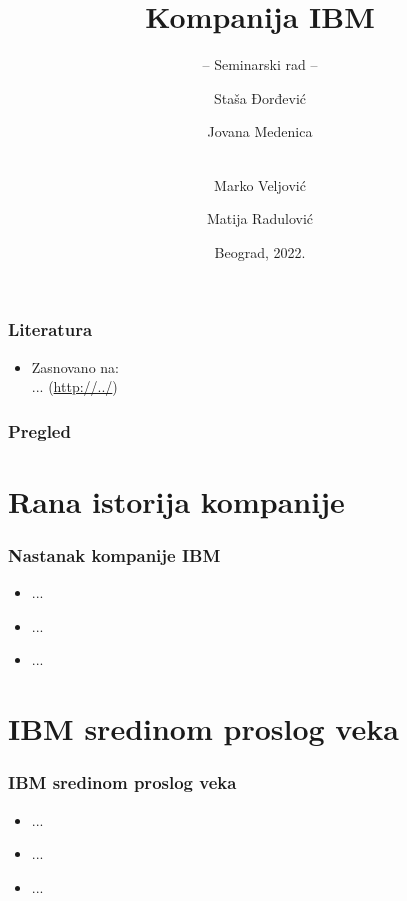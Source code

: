 \documentclass{beamer}
\title[]{Kompanija IBM}
\subtitle{-- Seminarski rad --}
\author[]{Staša Đorđević \and
Jovana Medenica \and  \\
Marko Veljović \and
Matija Radulović}
\institute[]{Matematički fakultet\\Univerzitet u Beogradu}
\date{
    \footnotesize{Beograd, 2022.}	
}
\begin{document}
\begin{frame}
	\thispagestyle{empty}
	\titlepage
\end{frame}

\begin{frame}[fragile]\frametitle{Literatura}
	\begin{itemize}
		\item Zasnovano na:\\
		...
		(\url{http://../})
	\end{itemize}
\end{frame}

\begin{frame}
	\frametitle{Pregled} %
	\tableofcontents[hidesubsections] 
\end{frame}

\section{Rana istorija kompanije}

\begin{frame}[fragile]\frametitle{Nastanak kompanije IBM}
	\begin{itemize}	
		\item ...
		\item ...
		\item ...
		\end{itemize}
\end{frame}

\section{IBM sredinom proslog veka}

\begin{frame}[fragile]\frametitle{IBM sredinom proslog veka}
	\begin{itemize}	
		\item ...
		\item ...
		\item ...
	\end{itemize}
\end{frame}
\end{document}
